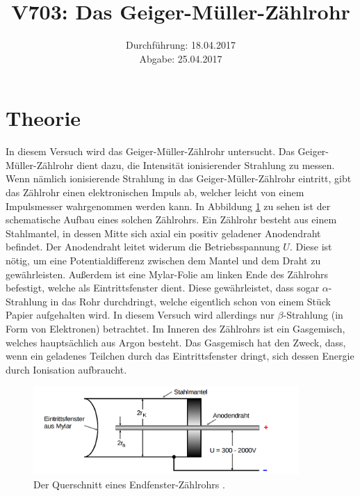 \documentclass[
  bibliography=totoc,     %
  captions=tableheading,  %
  titlepage=firstiscover, %
]{scrartcl}
\title{V703: Das Geiger-Müller-Zählrohr}
\author{
  Simon Schulte
  \texorpdfstring{
    \\
    \href{mailto:simon.schulte@udo.edu}{simon.schulte@udo.edu}
  }{}
  \texorpdfstring{\and}{, }
  Tim Sedlaczek
  \texorpdfstring{
    \\
    \href{mailto:tim.sedlaczek@udo.edu}{tim.sedlaczek@udo.edu}
  }{}
}
\date{Durchführung: 18.04.2017\\
      Abgabe: 25.04.2017}
\begin{document}
\maketitle
\thispagestyle{empty}
\tableofcontents
\newpage
\section{Theorie}
\label{sec:theorie}
In diesem Versuch wird das Geiger-Müller-Zählrohr untersucht. Das
Geiger-Müller-Zählrohr dient dazu, die Intensität ionisierender Strahlung zu
messen. Wenn nämlich ionisierende Strahlung in das Geiger-Müller-Zählrohr
eintritt, gibt das Zählrohr einen elektronischen Impuls ab, welcher leicht von
einem Impulsmesser wahrgenommen werden kann.
In Abbildung \ref{fig:V7031} zu sehen ist der schematische Aufbau eines
solchen Zählrohrs. Ein Zählrohr besteht aus einem Stahlmantel, in dessen
Mitte sich axial ein positiv geladener Anodendraht befindet. Der Anodendraht
leitet widerum die Betriebsspannung $U$. Diese ist nötig, um eine
Potentialdifferenz zwischen dem Mantel und dem Draht zu gewährleisten. Außerdem
ist eine Mylar-Folie am linken Ende des Zählrohrs befestigt, welche als
Eintrittsfenster dient. Diese gewährleistet, dass sogar $\alpha$-Strahlung in
das Rohr durchdringt, welche eigentlich schon von einem Stück Papier aufgehalten
wird. In diesem Versuch wird allerdings nur $\beta$-Strahlung (in Form von Elektronen)
betrachtet. Im Inneren des Zählrohrs ist ein Gasgemisch, welches hauptsächlich aus
Argon besteht. Das Gasgemisch hat den Zweck, dass, wenn ein geladenes Teilchen durch
das Eintrittsfenster dringt, sich dessen Energie durch Ionisation aufbraucht.
\begin{figure}[htb]
  \centering
  \includegraphics[width=0.9\textwidth]{V7031.png}
  \caption{Der Querschnitt eines Endfenster-Zählrohrs \cite{anleitung}.}
  \label{fig:V7031}
\end{figure}
\end{document}
